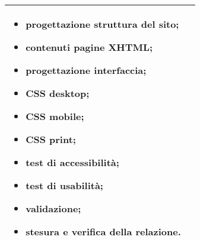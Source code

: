 \begin{table}[H]
\begin{tabular}{|l|p{}|}
{\begin{itemize}
			\setlength{\itemsep}{0pt}
			\setlength{\parskip}{0pt}
			\setlength{\parsep}{0pt} 
			\item progettazione struttura del sito;
			\item contenuti pagine XHTML;
			\item progettazione interfaccia;
			\item CSS desktop;
			\item CSS mobile;
			\item CSS print;
			\item test di accessibilità;
			\item test di usabilità;
			\item validazione;
			\item stesura e verifica della relazione.
		\end{itemize}} \\ \hline
\end{tabular}
\end{table}